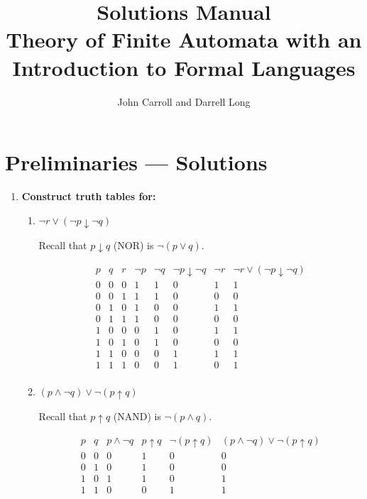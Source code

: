 \documentclass[11pt]{book}
\title{Solutions Manual\\
\large Theory of Finite Automata with an Introduction to Formal Languages}
\author{John Carroll and Darrell Long}
\begin{document}
\maketitle
\tableofcontents

\chapter{Preliminaries --- Solutions}

\begin{enumerate}[{0.}1. ]

\item \textbf{Construct truth tables for:}

\begin{enumerate}
\item $\neg r \vee (\neg p \downarrow \neg q)$

Recall that $p \downarrow q$ (NOR) is $\neg(p \vee q)$.

\[
\begin{array}{ccc|cc|cc|c}
p & q & r & \neg p & \neg q & \neg p \downarrow \neg q & \neg r & \neg r \vee (\neg p \downarrow \neg q)\\
\hline
0 & 0 & 0 & 1 & 1 & 0 & 1 & 1\\
0 & 0 & 1 & 1 & 1 & 0 & 0 & 0\\
0 & 1 & 0 & 1 & 0 & 0 & 1 & 1\\
0 & 1 & 1 & 1 & 0 & 0 & 0 & 0\\
1 & 0 & 0 & 0 & 1 & 0 & 1 & 1\\
1 & 0 & 1 & 0 & 1 & 0 & 0 & 0\\
1 & 1 & 0 & 0 & 0 & 1 & 1 & 1\\
1 & 1 & 1 & 0 & 0 & 1 & 0 & 1\\
\end{array}
\]

\item $(p \wedge \neg q) \vee \neg(p \uparrow q)$

Recall that $p \uparrow q$ (NAND) is $\neg(p \wedge q)$.

\[
\begin{array}{cc|c|c|c|c}
p & q & p \wedge \neg q & p \uparrow q & \neg(p \uparrow q) & (p \wedge \neg q)\vee\neg(p\uparrow q)\\
\hline
0 & 0 & 0 & 1 & 0 & 0\\
0 & 1 & 0 & 1 & 0 & 0\\
1 & 0 & 1 & 1 & 0 & 1\\
1 & 1 & 0 & 0 & 1 & 1\\
\end{array}
\]
\end{enumerate}


\end{enumerate}
\end{document}
